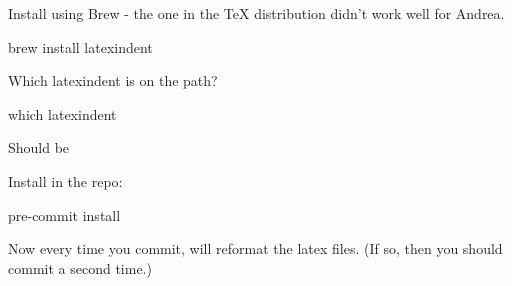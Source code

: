 Install  using Brew - the one in the TeX distribution didn't work well for Andrea.
%
\begin{console}
	brew install latexindent
\end{console}
%
Which latexindent is on the path?
%
\begin{console}
	which latexindent
\end{console}
%
Should be 

Install  in the repo:
%
\begin{console}
	pre-commit install
\end{console}
%
Now every time you commit,  will reformat the latex files.
(If so, then you should commit a second time.)
